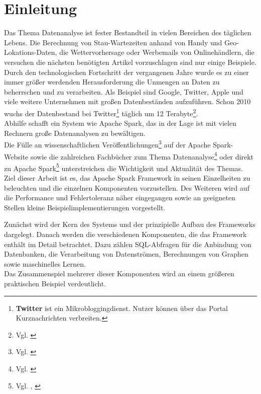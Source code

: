 \newpage
\chapter{Einleitung} 

Das Thema Datenanalyse ist fester Bestandteil in vielen Bereichen des täglichen Lebens. Die Berechnung von Stau-Wartezeiten anhand von Handy und Geo-Lokations-Daten, die Wettervorhersage oder Werbemails von Onlinehändlern, die versuchen die nächsten benötigten Artikel vorzuschlagen sind nur einige Beispiele.\\

\noindent
Durch den technologischen Fortschritt der vergangenen Jahre wurde es zu einer immer größer werdenden Herausforderung die Unmengen an Daten zu beherrschen und zu verarbeiten. Als Beispiel sind Google, Twitter, Apple und viele weitere Unternehmen mit großen Datenbeständen aufzuführen. Schon 2010 wuchs der Datenbestand bei Twitter\footnote{\textbf{Twitter} ist ein Mikrobloggingdienst. Nutzer können über das Portal Kurznachrichten verbreiten. } täglich um 12 Terabyte\footnote{Vgl. \cite{TWITTER_12}}. \\
Abhilfe schafft ein System wie Apache Spark, das in der Lage ist mit vielen Rechnern große Datenanalysen zu bewältigen. \\

\noindent
Die Fülle an wissenschaftlichen Veröffentlichungen\footnote{Vgl. \cite{SPRESEARCH}} auf der Apache Spark-Website sowie die zahlreichen Fachbücher zum Thema Datenanalyse\footnote{Vgl. \cite{DA15}} oder direkt zu Apache Spark\footnote{Vgl. \cite{AAWS15}, \cite{BDS16}} unterstreichen die Wichtigkeit und Aktualität des Themas.\\

\noindent
Ziel dieser Arbeit ist es, das Apache Spark Framework in seinen Einzelheiten zu beleuchten und die einzelnen Komponenten vorzustellen. Des Weiteren wird auf die Performance und Fehlertoleranz näher eingegangen sowie an geeigneten Stellen kleine Beispielimplementierungen vorgestellt.

\noindent
Zunächst wird der Kern des Systems und der prinzipielle Aufbau des Frameworks dargelegt. Danach werden die verschiedenen Komponenten, die das Framework enthält im Detail betrachtet. Dazu zählen SQL-Abfragen für die Anbindung von Datenbanken, die Verarbeitung von Datenströmen, Berechnungen von Graphen sowie maschinelles Lernen.\\
Das Zusammenspiel mehrerer dieser Komponenten wird an einem größeren praktischen Beispiel verdeutlicht. \\

